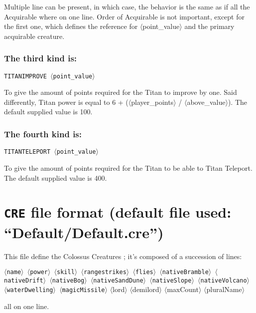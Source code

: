 \documentclass{article}
\begin{document}
Multiple line can be present, in which case, the behavior is the same as if all the Acquirable where on one line. Order of Acquirable is not important, except for the first one, which defines the reference for $\langle$point\_value$\rangle$ and the primary acquirable creature.

\subsubsection*{The third kind is:}

\texttt{TITANIMPROVE $\langle$point\_value$\rangle$}

To give the amount of points required for the Titan to improve by one. Said differently, Titan power is equal to 6 + ($\langle$player\_points$\rangle$ / $\langle$above\_value$\rangle$). The default supplied value is 100.

\subsubsection*{The fourth kind is:}

\texttt{TITANTELEPORT $\langle$point\_value$\rangle$}

To give the amount of points required for the Titan to be able to Titan Teleport. The default supplied value is 400.

\section{\texttt{CRE} file format (default file used: ``Default/Default.cre'')}

This file define the Colossus Creatures ; it's composed of a succession of lines:

\texttt{$\langle$name$\rangle$ $\langle$power$\rangle$ $\langle$skill$\rangle$
$\langle$rangestrikes$\rangle$ $\langle$flies$\rangle$
$\langle$nativeBramble$\rangle$ $\langle$nativeDrift$\rangle$ $\langle$nativeBog$\rangle$ $\langle$nativeSandDune$\rangle$ $\langle$nativeSlope$\rangle$
$\langle$nativeVolcano$\rangle$ $\langle$waterDwelling$\rangle$ $\langle$magicMissile$\rangle$}
$\langle$lord$\rangle$ $\langle$demilord$\rangle$
$\langle$maxCount$\rangle$
$\langle$pluralName$\rangle$

all on one line.
\end{document}
